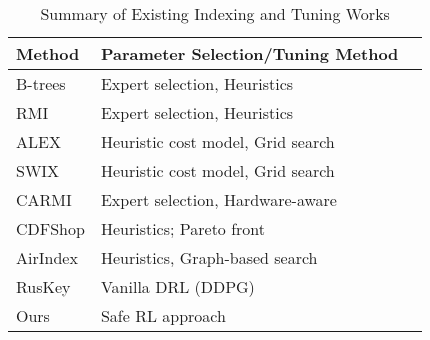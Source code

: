 \begin{table}[t]
    \centering
    \captionsetup{font=small}
    \small
    \begin{tabular}{l l p{9cm}}
        \hline
        \textbf{Method} & \textbf{Parameter Selection/Tuning Method}  \\
        \hline
        B-trees \cite{comer1979ubiquitous} & Expert selection,  Heuristics \\
        RMI \cite{kraska2018case} &  Expert selection,  Heuristics \\
        ALEX \cite{ding2020alex} & Heuristic cost model, Grid search \\
        SWIX \cite{liang2024swix} & Heuristic cost model, Grid search \\
        CARMI \cite{zhang2021carmi} & Expert selection, Hardware-aware \\
        CDFShop \cite{marcus2020cdfshop} & Heuristics; Pareto front \\
        AirIndex \cite{chockchowwat2023airindex} & Heuristics, Graph-based search  \\
        RusKey \cite{mo2023learning} & Vanilla DRL (DDPG)  \\
        Ours & Safe RL approach\\
        \hline
    \end{tabular}
    \caption{Summary of Existing Indexing and Tuning Works}
    \label{tab:index_methods}
\end{table}

